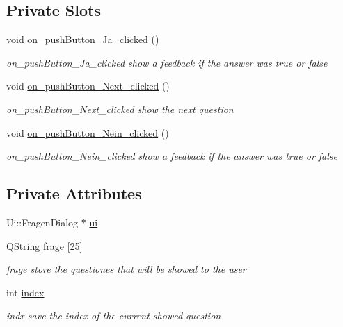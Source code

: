 \subsection*{Private Slots}
\begin{DoxyCompactItemize}
\item 
void \mbox{\hyperlink{class_true_false_question_dialog_a019068d63e7841958129f4e03f363a65}{on\+\_\+push\+Button\+\_\+\+Ja\+\_\+clicked}} ()
\begin{DoxyCompactList}\small\item\em on\+\_\+push\+Button\+\_\+\+Ja\+\_\+clicked show a feedback if the answer was true or false \end{DoxyCompactList}\item 
void \mbox{\hyperlink{class_true_false_question_dialog_a54e57d5125256a5ea7c7ee58bbba4a10}{on\+\_\+push\+Button\+\_\+\+Next\+\_\+clicked}} ()
\begin{DoxyCompactList}\small\item\em on\+\_\+push\+Button\+\_\+\+Next\+\_\+clicked show the next question \end{DoxyCompactList}\item 
void \mbox{\hyperlink{class_true_false_question_dialog_a3574e49580704a1f20e343b471ca43af}{on\+\_\+push\+Button\+\_\+\+Nein\+\_\+clicked}} ()
\begin{DoxyCompactList}\small\item\em on\+\_\+push\+Button\+\_\+\+Nein\+\_\+clicked show a feedback if the answer was true or false \end{DoxyCompactList}\end{DoxyCompactItemize}
\subsection*{Private Attributes}
\begin{DoxyCompactItemize}
\item 
Ui\+::\+Fragen\+Dialog $\ast$ \mbox{\hyperlink{class_true_false_question_dialog_a2432171c1d7d2f3a798389d9a4d464fc}{ui}}
\item 
Q\+String \mbox{\hyperlink{class_true_false_question_dialog_a9793a0edd3a9068536a482d1b136785c}{frage}} \mbox{[}25\mbox{]}
\begin{DoxyCompactList}\small\item\em frage store the questiones that will be showed to the user \end{DoxyCompactList}\item 
int \mbox{\hyperlink{class_true_false_question_dialog_a8718800a2ddcab39408d0143e2906685}{index}}
\begin{DoxyCompactList}\small\item\em indx save the index of the current showed question \end{DoxyCompactList}\end{DoxyCompactItemize}


